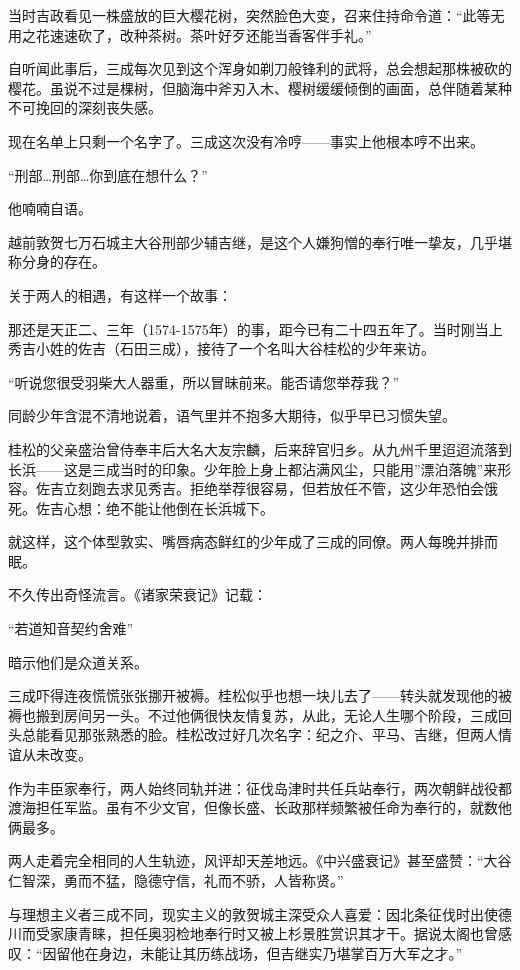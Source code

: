 \documentclass[
]{book}
\begin{document}
当时吉政看见一株盛放的巨大樱花树，突然脸色大变，召来住持命令道：``此等无用之花速速砍了，改种茶树。茶叶好歹还能当香客伴手礼。''

自听闻此事后，三成每次见到这个浑身如剃刀般锋利的武将，总会想起那株被砍的樱花。虽说不过是棵树，但脑海中斧刃入木、樱树缓缓倾倒的画面，总伴随着某种不可挽回的深刻丧失感。

现在名单上只剩一个名字了。三成这次没有冷哼------事实上他根本哼不出来。

``刑部\ldots 刑部\ldots 你到底在想什么？''

他喃喃自语。

越前敦贺七万石城主大谷刑部少辅吉继，是这个人嫌狗憎的奉行唯一挚友，几乎堪称分身的存在。

关于两人的相遇，有这样一个故事：

那还是天正二、三年（1574-1575年）的事，距今已有二十四五年了。当时刚当上秀吉小姓的佐吉（石田三成），接待了一个名叫大谷桂松的少年来访。

``听说您很受羽柴大人器重，所以冒昧前来。能否请您举荐我？''

同龄少年含混不清地说着，语气里并不抱多大期待，似乎早已习惯失望。

桂松的父亲盛治曾侍奉丰后大名大友宗麟，后来辞官归乡。从九州千里迢迢流落到长浜------这是三成当时的印象。少年脸上身上都沾满风尘，只能用''漂泊落魄''来形容。佐吉立刻跑去求见秀吉。拒绝举荐很容易，但若放任不管，这少年恐怕会饿死。佐吉心想：绝不能让他倒在长浜城下。

就这样，这个体型敦实、嘴唇病态鲜红的少年成了三成的同僚。两人每晚并排而眠。

不久传出奇怪流言。《诸家荣衰记》记载：

``若道知音契约舍难''

暗示他们是众道关系。

三成吓得连夜慌慌张张挪开被褥。桂松似乎也想一块儿去了------转头就发现他的被褥也搬到房间另一头。不过他俩很快友情复苏，从此，无论人生哪个阶段，三成回头总能看见那张熟悉的脸。桂松改过好几次名字：纪之介、平马、吉继，但两人情谊从未改变。

作为丰臣家奉行，两人始终同轨并进：征伐岛津时共任兵站奉行，两次朝鲜战役都渡海担任军监。虽有不少文官，但像长盛、长政那样频繁被任命为奉行的，就数他俩最多。

两人走着完全相同的人生轨迹，风评却天差地远。《中兴盛衰记》甚至盛赞：``大谷仁智深，勇而不猛，隐德守信，礼而不骄，人皆称贤。''

与理想主义者三成不同，现实主义的敦贺城主深受众人喜爱：因北条征伐时出使德川而受家康青睐，担任奥羽检地奉行时又被上杉景胜赏识其才干。据说太阁也曾感叹：``因留他在身边，未能让其历练战场，但吉继实乃堪掌百万大军之才。''
\end{document}

